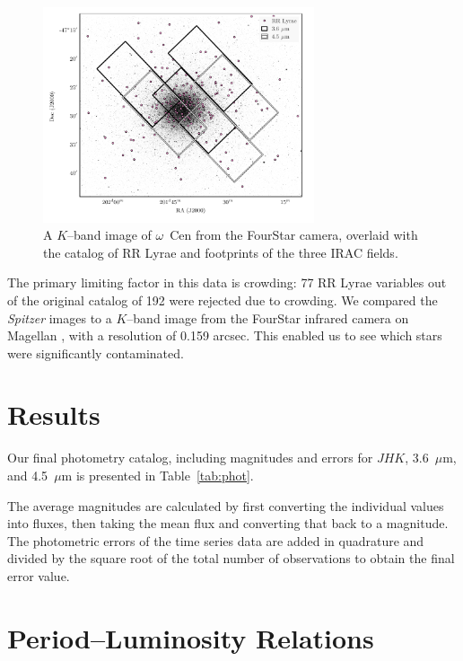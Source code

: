 \documentclass[a4paper,fleqn,usenatbib]{mnras}
\begin{document}
\begin{figure}
\begin{center}
\includegraphics[width=80mm]{final_plots/omegacen_coverage_map.pdf}
\caption{A $K$--band image of $\omega$~Cen from the FourStar camera, overlaid with the catalog of RR Lyrae \citep{2004A&A...424.1101K} and footprints of the three IRAC fields.}
\label{fig:omegaCen_fields}
\end{center}
\end{figure}

The primary limiting factor in this data is crowding: 77 RR Lyrae variables out of the original catalog of 192 \citep{2004A&A...424.1101K} were rejected due to crowding. We compared the {\it Spitzer} images to a $K$--band image from the FourStar infrared camera on Magellan \citep{2013PASP..125..654P}, with a resolution of 0.159 arcsec. This enabled us to see which stars were significantly contaminated. 

\section{Results}
\label{sec:results}

Our final photometry catalog, including magnitudes and errors for $J\!H\!K$, 3.6~$\mu$m, and 4.5~$\mu$m is presented in Table~\ref{tab:phot}.

The average magnitudes are calculated by first converting the individual values into fluxes, then taking the mean flux and converting that back to a magnitude. The photometric errors of the time series data are added in quadrature and divided by the square root of the total number of observations to obtain the final error value.

\section{Period--Luminosity Relations}
\label{sec:pl_relation}
\end{document}

